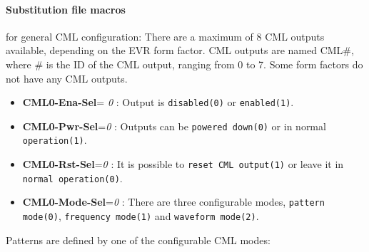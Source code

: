 \documentclass[12pt,a4paper]{article}
\begin{document}
\paragraph{Substitution file macros} for general CML configuration:
There are a maximum of 8 CML outputs available, depending on the EVR form factor. CML outputs are named CML\#, where \# is the ID of the CML output, ranging from 0 to 7. Some form factors do not have any CML outputs.
\begin{itemize}
\item
  \textbf{CML0-Ena-Sel}= \emph{0} : Output is \texttt{disabled(0)} or \texttt{enabled(1)}.
\item
  \textbf{CML0-Pwr-Sel}=\emph{0} : Outputs can be \texttt{powered down(0)} or in normal \texttt{operation(1)}.
\item
  \textbf{CML0-Rst-Sel}=\emph{0} : It is possible to \texttt{reset CML output(1)} or leave it in \texttt{normal operation(0)}.
\item
  \textbf{CML0-Mode-Sel}=\emph{0} : There are three configurable modes, \texttt{pattern mode(0)}, \texttt{frequency mode(1)} and \texttt{waveform mode(2)}.
\end{itemize}
Patterns are defined by one of the configurable CML modes:
\end{document}
